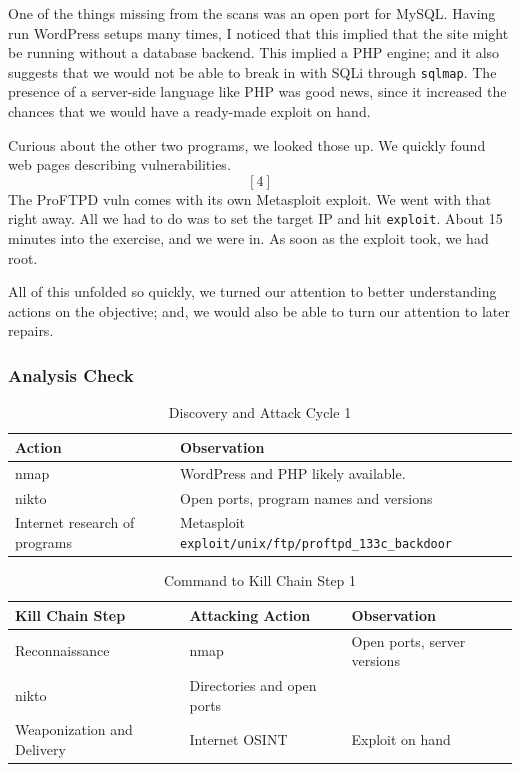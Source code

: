 One of the things missing from the scans was an open \gls{port} for MySQL.  Having run WordPress setups many times, I noticed that this implied that the site might be running without a \gls{database} backend.  This implied a PHP engine; and it also suggests that we would not be able to break in with SQLi through \texttt{sqlmap}.  The presence of a server-side language like PHP was good news, since it increased the chances that we would have a ready-made \gls{exploit} on hand.

Curious about the other two programs, we looked those up.  We quickly found web pages describing vulnerabilities. \[[4]\] The ProFTPD vuln comes with its own Metasploit exploit.  We went with that right away.  All we had to do was to set the target IP and hit \texttt{exploit}.  About 15 minutes into the exercise, and we were in.  As soon as the \gls{exploit} took, we had root. 


All of this unfolded so quickly, we turned our attention to better understanding actions on the objective; and, we would also be able to turn our attention to later repairs.

\subsubsection{Analysis Check}
\begin{table}[H]
\caption{Discovery and Attack Cycle 1}
\centering
\begin{tabular}{|l|l|}
\hline
Action & Observation \\
\hline
nmap & WordPress and PHP likely available. \\
nikto & Open ports, program names and versions \\
Internet research of programs & Metasploit \texttt{exploit/unix/ftp/proftpd\_133c\_backdoor} \\
\hline
\end{tabular}
\end{table}

\begin{table}[H]
\caption{Command to Kill Chain Step 1}
\centering
\begin{tabular}{|l|l|l|}
\hline
Kill Chain Step & Attacking Action & Observation \\
\hline
Reconnaissance & nmap & Open ports, server versions \\
nikto & Directories and open ports &  \\
Weaponization and Delivery & Internet OSINT & Exploit\index{exploit} on hand \\
\hline
\end{tabular}
\end{table}



